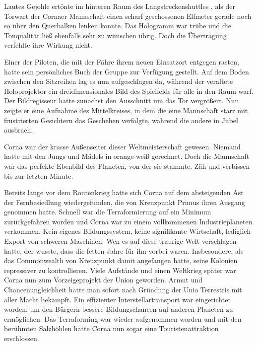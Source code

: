 Lautes Gejohle ertönte im hinteren Raum des Langstreckenshuttles , als der Torwart der Cornaer Mannschaft einen scharf geschossenen Elfmeter gerade noch so über den Querbalken lenken konnte. Das Hologramm war trübe und die Tonqualität ließ ebenfalls sehr zu wünschen übrig. Doch die Übertragung verfehlte ihre Wirkung nicht.

\par

Einer der Piloten, die mit der Fähre ihrem neuen Einsatzort entgegen rasten, hatte sein persönliches Buch der Gruppe zur Verfügung gestellt. Auf dem Boden zwischen den Sitzreihen lag es nun aufgeschlagen da, während der veraltete Holoprojektor ein dreidimensionales Bild des Spielfelds für alle in den Raum warf. Der Bildregisseur hatte zunächst den Ausschnitt um das Tor vergrößert. Nun zeigte er eine Aufnahme des Mittelkreises, in dem die eine Mannschaft starr mit frustrierten Gesichtern das Geschehen verfolgte, während die andere in Jubel ausbrach.

\par

Corna war der krasse Außenseiter dieser Weltmeisterschaft gewesen. Niemand hatte mit den Jungs und Mädels in orange-weiß gerechnet. Doch die Mannschaft war das perfekte Ebenbild des Planeten, von der sie stammte. Zäh und verbissen bis zur letzten Minute.

\par

Bereits lange vor dem Routenkrieg hatte sich Corna auf dem absteigenden Ast der Fernbesiedlung wiedergefunden, die von Kreuzpunkt Primus ihren Ausgang genommen hatte. Schnell war die Terraformierung auf ein Minimum zurückgefahren worden und Corna war zu einem vollkommenen Industrieplaneten verkommen. Kein eigenes Bildungssystem, keine signifikante Wirtschaft, lediglich Export von schweren Maschinen. Wen es auf diese traurige Welt verschlagen hatte, der wusste, dass die fetten Jahre für ihn vorbei waren. Insbesondere, als das Commonwealth von Kreuzpunkt damit angefangen hatte, seine Kolonien repressiver zu kontrollieren. Viele Aufstände und einen Weltkrieg später war Corna nun zum Vorzeigeprojekt der Union geworden. Armut und Chancenungleichheit hatte man sofort nach Gründung der Unio Terrestris mit aller Macht bekämpft. Ein effizienter Interstellartransport war eingerichtet worden, um den Bürgern bessere Bildungschancen auf anderen Planeten zu ermöglichen. Das Terraforming war wieder aufgenommen worden und mit den berühmten Salzhöhlen hatte Corna nun sogar eine Touristenattraktion erschlossen.

